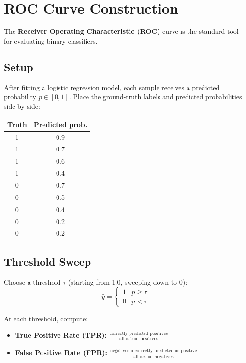 \documentclass[11pt]{article}
\begin{document}
\newpage
\section{ROC Curve Construction}

The \textbf{Receiver Operating Characteristic (ROC)} curve is the standard
tool for evaluating binary classifiers.

\subsection{Setup}
After fitting a logistic regression model, each sample receives a predicted
probability $p \in [0,1]$. Place the ground-truth labels and predicted
probabilities side by side:

\begin{center}
\begin{tabular}{@{}cc@{}}
\toprule
\textbf{Truth} & \textbf{Predicted prob.} \\
\midrule
1 & 0.9 \\
1 & 0.7 \\
1 & 0.6 \\
1 & 0.4 \\
0 & 0.7 \\
0 & 0.5 \\
0 & 0.4 \\
0 & 0.2 \\
0 & 0.2 \\
\bottomrule
\end{tabular}
\end{center}

\subsection{Threshold Sweep}
Choose a threshold $\tau$ (starting from 1.0, sweeping down to 0):
\[
\hat{y} = \begin{cases} 1 & p \geq \tau \\ 0 & p < \tau \end{cases}
\]

At each threshold, compute:
\begin{itemize}
    \item \textbf{True Positive Rate (TPR):}
      $\displaystyle\frac{\text{correctly predicted positives}}{\text{all actual positives}}$
    \item \textbf{False Positive Rate (FPR):}
      $\displaystyle\frac{\text{negatives incorrectly predicted as positive}}{\text{all actual negatives}}$
\end{itemize}
\end{document}
